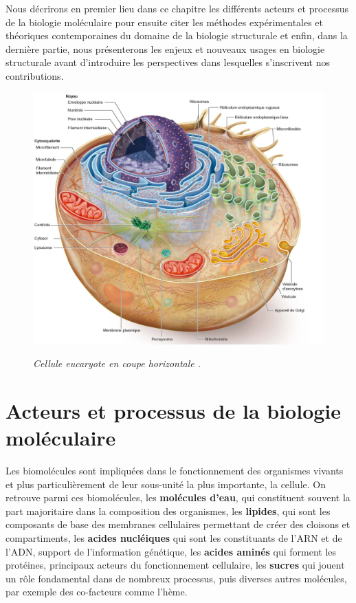 Nous décrirons en premier lieu dans ce chapitre les différents acteurs et processus de la biologie moléculaire pour ensuite citer les méthodes expérimentales et théoriques contemporaines du domaine de la biologie structurale et enfin, dans la dernière partie, nous présenterons les enjeux et nouveaux usages en biologie structurale avant d'introduire les perspectives dans lesquelles s'inscrivent nos contributions. 

\begin{figure}[h]
  \centering
  {\includegraphics[width=0.9\linewidth]{./figures/ch1/cellule}}
    \caption[Cellule eucaryote]{\it Cellule eucaryote en coupe horizontale  \cite{johnson2011biologie}.}
    \label{Fig:cellule}
  \hspace{0.2cm}
\end{figure}

\section{Acteurs et processus de la biologie moléculaire}

Les biomolécules sont impliquées dans le fonctionnement des organismes vivants et plus particulièrement de leur sous-unité la plus importante, la cellule. On retrouve parmi ces biomolécules, les \textbf{molécules d'eau}, qui constituent souvent la part majoritaire dans la composition des organismes, les \textbf{lipides}, qui sont les composants de base des membranes cellulaires permettant de créer des cloisons et compartiments, les \textbf{acides nucléiques} qui sont les constituants de l'ARN et de l'ADN, 
support de l'information génétique, les \textbf{acides aminés} qui forment les protéines, principaux acteurs du fonctionnement cellulaire, les \textbf{sucres} qui jouent un rôle fondamental dans de nombreux processus, puis diverses autres molécules, par exemple des co-facteurs comme l'hème.


